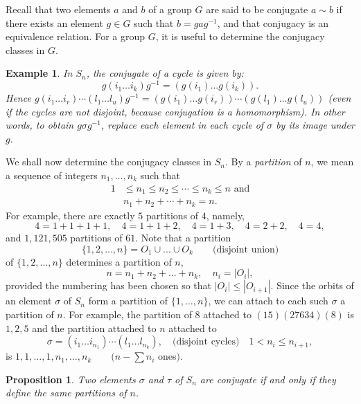 \documentclass[a4paper,11pt,final]{memoir}%
\newtheorem{proposition}[X]{Proposition}
\newtheorem{example}[X]{Example}
\theoremstyle{nonumberplain}
\begin{document}
Recall that two elements $a$ and $b$ of a group $G$ are said to be conjugate
$a\sim b$ if there exists an element $g\in G$ such that $b=gag^{-1}$, and that
conjugacy is an equivalence relation. For a group $G$, it is useful to
determine the conjugacy classes in $G$.

\begin{example}
\label{ga24} In $S_{n}$, the conjugate of a cycle is given by:
\[
g(i_{1}\ldots i_{k})g^{-1}=(g(i_{1})\ldots g(i_{k})).
\]
Hence $g(i_{1}\ldots i_{r})\cdots(l_{1}\ldots l_{u})g^{-1}=(g(i_{1})\ldots
g(i_{r}))\cdots(g(l_{1})...g(l_{u}))$ (even if the cycles are not disjoint,
because conjugation is a homomorphism). In other words, to obtain $g\sigma
g^{-1}$, replace each element in each cycle of $\sigma$ by its image under
$g.$
\end{example}

We shall now determine the conjugacy classes in $S_{n}$. By a
\emph{partition\/}%
of $n$, we mean a sequence of integers $n_{1},\ldots,n_{k}$ such that
\begin{align*}
1  &  \leq n_{1}\leq n_{2}\leq\cdots\leq n_{k}\leq n\text{ and}\\
&  n_{1}+n_{2}+\cdots+n_{k}=n.
\end{align*}
For example, there are exactly $5$ partitions of $4$, namely,%
\[
4=1+1+1+1,\quad4=1+1+2,\quad4=1+3,\quad4=2+2,\quad4=4,
\]
and $1,121,505$ partitions of $61$. Note that a partition
\[
\{1,2,...,n\}=O_{1}\cup...\cup O_{k}\qquad\text{(disjoint union)}%
\]
of $\{1,2,\ldots,n\}$ determines a partition of $n$,
\[
n=n_{1}+n_{2}+...+n_{k},\quad n_{i}=|O_{i}|,
\]
provided the numbering has been chosen so that $|O_{i}|\leq|O_{i+1}|$. Since
the orbits of an element $\sigma$ of $S_{n}$ form a partition of
$\{1,\ldots,n\}$, we can attach to each such $\sigma$ a partition of $n$. For
example, the partition of $8$ attached to $(15)(27634)(8)$ is $1,2,5$ and the
partition attached to $n$ attached to
\[
\sigma=(i_{1}\ldots i_{n_{1}})\cdots(l_{1}\ldots l_{n_{k}}),\quad
\text{(disjoint cycles)}\quad1<n_{i}\leq n_{i+1},
\]
is $1,1,\ldots,1,n_{1},\ldots,n_{k}\qquad(n-%
{\textstyle\sum}
n_{i}$ ones$).$

\begin{proposition}
\label{ga25} Two elements $\sigma$ and $\tau$ of $S_{n}$ are conjugate if and
only if they define the same partitions of $n$.
\end{proposition}
\end{document}
